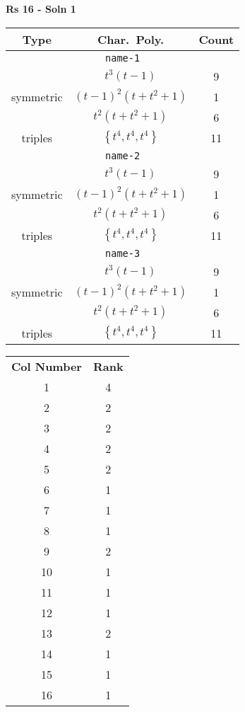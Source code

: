 \documentclass{article}
\begin{document}
    \textbf{Rs 16 - Soln 1}
    \begin{table}
    \begin{tabular}{|c|c|c|}
    \hline
    \textbf{Type} & \textbf{Char.~Poly.} & \textbf{Count} \\
    \hline \multicolumn{3}{|c|}{\texttt{name-1}} \\ \hline
    \multirow{3}{*}{symmetric}
     & $t^3(t - 1)$ & 9 \\
     & $(t - 1)^2(t + t^2 + 1)$ & 1 \\
     & $t^2(t + t^2 + 1)$ & 6 \\
    \hline
    \multirow{1}{*}{triples}
     & $\left\{t^4,t^4,t^4\right\}$ & 11 \\
    \hline \multicolumn{3}{|c|}{\texttt{name-2}} \\ \hline
    \multirow{3}{*}{symmetric}
     & $t^3(t - 1)$ & 9 \\
     & $(t - 1)^2(t + t^2 + 1)$ & 1 \\
     & $t^2(t + t^2 + 1)$ & 6 \\
    \hline
    \multirow{1}{*}{triples}
     & $\left\{t^4,t^4,t^4\right\}$ & 11 \\
    \hline \multicolumn{3}{|c|}{\texttt{name-3}} \\ \hline
    \multirow{3}{*}{symmetric}
     & $t^3(t - 1)$ & 9 \\
     & $(t - 1)^2(t + t^2 + 1)$ & 1 \\
     & $t^2(t + t^2 + 1)$ & 6 \\
    \hline
    \multirow{1}{*}{triples}
     & $\left\{t^4,t^4,t^4\right\}$ & 11 \\
    \hline
    \end{tabular}
    \end{table}
    \begin{table}
    \begin{tabular}{|c|c|}
    \hline
    \textbf{Col Number} & \textbf{Rank}\\
    1 & 4 \\ 
    2 & 2 \\ 
    3 & 2 \\ 
    4 & 2 \\ 
    5 & 2 \\ 
    6 & 1 \\ 
    7 & 1 \\ 
    8 & 1 \\ 
    9 & 2 \\ 
    10 & 1 \\ 
    11 & 1 \\ 
    12 & 1 \\ 
    13 & 2 \\ 
    14 & 1 \\ 
    15 & 1 \\ 
    16 & 1 \\ 
    \hline
    \end{tabular}
    \end{table}
\end{document}
